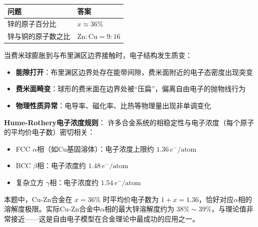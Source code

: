 \begin{formulabox}[答案汇总]
\begin{center}
\begin{tabular}{ll}
\toprule
\textbf{问题} & \textbf{答案} \\
\midrule
锌的原子百分比 & $x \approx 36\%$ \\
锌与铜的原子数之比 & $\mathrm{Zn}:\mathrm{Cu} = 9:16$ \\
\bottomrule
\end{tabular}
\end{center}
\end{formulabox}

\begin{insightbox}
当费米球膨胀到与布里渊区边界接触时，电子结构发生质变：
\begin{itemize}
    \item \textbf{能隙打开}：布里渊区边界处存在能带间隙，费米面附近的电子态密度出现突变
    \item \textbf{费米面畸变}：球形的费米面在边界处被``压扁''，偏离自由电子的抛物线行为
    \item \textbf{物理性质异常}：电导率、磁化率、比热等物理量出现非单调变化
\end{itemize}

\textbf{Hume-Rothery电子浓度规则}：
许多合金系统的相稳定性与电子浓度（每个原子的平均价电子数）密切相关：
\begin{itemize}
    \item FCC $\alpha$相（如Cu基固溶体）：电子浓度上限约 $1.36\,e^-/\text{atom}$
    \item BCC $\beta$相：电子浓度约 $1.48\,e^-/\text{atom}$
    \item 复杂立方 $\gamma$相：电子浓度约 $1.54\,e^-/\text{atom}$
\end{itemize}

本题中，Cu-Zn合金在 $x=36\%$ 时平均价电子数为 $1+x=1.36$，恰好对应$\alpha$相的溶解度极限。实际Cu-Zn合金中$\alpha$相的最大锌溶解度约为 $38\%\sim 39\%$，与理论值非常接近——这是自由电子模型在合金理论中最成功的应用之一。
\end{insightbox}

